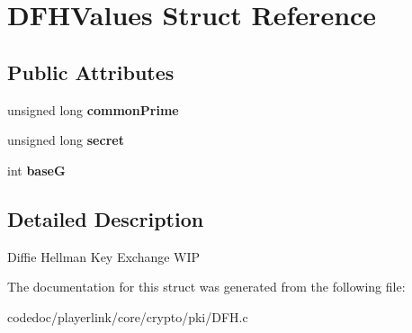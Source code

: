 \hypertarget{structDFHValues}{}\section{D\+F\+H\+Values Struct Reference}
\label{structDFHValues}
\subsection*{Public Attributes}
\begin{DoxyCompactItemize}
\item 
\mbox{\label{structDFHValues_afa28817c98f9d6568fee6b5a44688278}} 
unsigned long {\bfseries common\+Prime}
\item 
\mbox{\label{structDFHValues_ab97ffcc83fdbde9852cc107e5c89baa4}} 
unsigned long {\bfseries secret}
\item 
\mbox{\label{structDFHValues_acde3e777b88a99bb39c95203b556b486}} 
int {\bfseries baseG}
\end{DoxyCompactItemize}


\subsection{Detailed Description}
Diffie Hellman Key Exchange W\+IP 

The documentation for this struct was generated from the following file\+:\begin{DoxyCompactItemize}
\item 
codedoc/playerlink/core/crypto/pki/D\+F\+H.\+c\end{DoxyCompactItemize}
